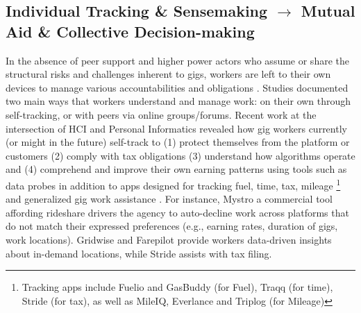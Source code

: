 \subsection{{Individual Tracking \& Sensemaking $\rightarrow$ Mutual Aid \& Collective Decision-making}}
In the absence of peer support and higher power actors who assume or share the structural risks and challenges inherent to gigs, workers are left to their own devices to manage {various} accountabilities {and obligations} \cite{consent, dalal2023understanding, accountable}. 
Studies documented two main ways that workers understand and manage work: on their own through self-tracking, or with peers via online groups/forums. 
Recent work at the intersection of HCI and Personal Informatics revealed how gig workers currently (or might in the future) self-track to (1) protect themselves from the platform \cite{privacy} or customers \cite{visibility, sousveillance} (2) comply with tax obligations \cite{tax_lives, taxing} (3) understand how algorithms operate \cite{sousveillance, zhang2023stakeholder} and (4) comprehend and improve their own earning patterns \cite{zhang2023stakeholder, accountable, supporting} using tools such as data probes {in addition to apps designed for tracking fuel, time, tax, mileage \footnote{Tracking apps include Fuelio and GasBuddy (for Fuel), Traqq (for time), Stride (for tax), as well as MileIQ, Everlance and Triplog (for Mileage)} and generalized gig work assistance \cite{accountable}. For instance, Mystro a commercial tool affording rideshare drivers the agency to auto-decline work across platforms that do not match their expressed preferences (e.g., earning rates, duration of gigs, work locations). 
Gridwise and Farepilot provide workers data-driven insights about in-demand locations, while Stride assists with tax filing. } 

